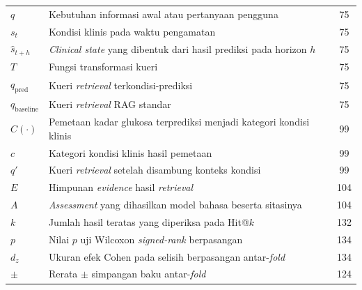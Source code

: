 \begin{longtable}{@{} l >{\raggedright\arraybackslash}p{9cm} c @{}}
$q$ & Kebutuhan informasi awal atau pertanyaan pengguna & 75 \\
$s_t$ & Kondisi klinis pada waktu pengamatan & 75 \\
$\hat{s}_{t+h}$ & \emph{Clinical state} yang dibentuk dari hasil prediksi pada horizon $h$ & 75 \\
$T$ & Fungsi transformasi kueri & 75 \\
$q_{\mathrm{pred}}$ & Kueri \emph{retrieval} terkondisi-prediksi & 75 \\
$q_{\mathrm{baseline}}$ & Kueri \emph{retrieval} RAG standar & 75 \\
$C(\cdot)$ & Pemetaan kadar glukosa terprediksi menjadi kategori kondisi klinis & 99 \\
$c$ & Kategori kondisi klinis hasil pemetaan & 99 \\
$q'$ & Kueri \emph{retrieval} setelah disambung konteks kondisi & 99 \\
$E$ & Himpunan \emph{evidence} hasil \emph{retrieval} & 104 \\
$A$ & \emph{Assessment} yang dihasilkan model bahasa beserta sitasinya & 104 \\[1ex]

$k$ & Jumlah hasil teratas yang diperiksa pada Hit@$k$ & 132 \\
$p$ & Nilai $p$ uji Wilcoxon \emph{signed-rank} berpasangan & 134 \\
$d_z$ & Ukuran efek Cohen pada selisih berpasangan antar-\emph{fold} & 134 \\
$\pm$ & Rerata $\pm$ simpangan baku antar-\emph{fold} & 124 \\

\end{longtable}
